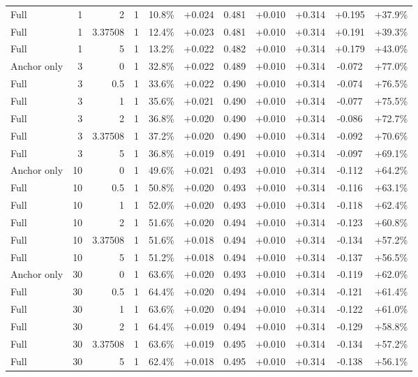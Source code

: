 \begin{table}[htbp]
\begin{tabular}{lrrrccccccc}
Full & 1 & 2 & 1 & 10.8\% & +0.024 & 0.481 & +0.010 & +0.314 & +0.195 & +37.9\% \\
Full & 1 & 3.37508 & 1 & 12.4\% & +0.023 & 0.481 & +0.010 & +0.314 & +0.191 & +39.3\% \\
Full & 1 & 5 & 1 & 13.2\% & +0.022 & 0.482 & +0.010 & +0.314 & +0.179 & +43.0\% \\
Anchor only & 3 & 0 & 1 & 32.8\% & +0.022 & 0.489 & +0.010 & +0.314 & -0.072 & +77.0\% \\
Full & 3 & 0.5 & 1 & 33.6\% & +0.022 & 0.490 & +0.010 & +0.314 & -0.074 & +76.5\% \\
Full & 3 & 1 & 1 & 35.6\% & +0.021 & 0.490 & +0.010 & +0.314 & -0.077 & +75.5\% \\
Full & 3 & 2 & 1 & 36.8\% & +0.020 & 0.490 & +0.010 & +0.314 & -0.086 & +72.7\% \\
Full & 3 & 3.37508 & 1 & 37.2\% & +0.020 & 0.490 & +0.010 & +0.314 & -0.092 & +70.6\% \\
Full & 3 & 5 & 1 & 36.8\% & +0.019 & 0.491 & +0.010 & +0.314 & -0.097 & +69.1\% \\
Anchor only & 10 & 0 & 1 & 49.6\% & +0.021 & 0.493 & +0.010 & +0.314 & -0.112 & +64.2\% \\
Full & 10 & 0.5 & 1 & 50.8\% & +0.020 & 0.493 & +0.010 & +0.314 & -0.116 & +63.1\% \\
Full & 10 & 1 & 1 & 52.0\% & +0.020 & 0.493 & +0.010 & +0.314 & -0.118 & +62.4\% \\
Full & 10 & 2 & 1 & 51.6\% & +0.020 & 0.494 & +0.010 & +0.314 & -0.123 & +60.8\% \\
Full & 10 & 3.37508 & 1 & 51.6\% & +0.018 & 0.494 & +0.010 & +0.314 & -0.134 & +57.2\% \\
Full & 10 & 5 & 1 & 51.2\% & +0.018 & 0.494 & +0.010 & +0.314 & -0.137 & +56.5\% \\
Anchor only & 30 & 0 & 1 & 63.6\% & +0.020 & 0.493 & +0.010 & +0.314 & -0.119 & +62.0\% \\
Full & 30 & 0.5 & 1 & 64.4\% & +0.020 & 0.494 & +0.010 & +0.314 & -0.121 & +61.4\% \\
Full & 30 & 1 & 1 & 63.6\% & +0.020 & 0.494 & +0.010 & +0.314 & -0.122 & +61.0\% \\
Full & 30 & 2 & 1 & 64.4\% & +0.019 & 0.494 & +0.010 & +0.314 & -0.129 & +58.8\% \\
Full & 30 & 3.37508 & 1 & 63.6\% & +0.019 & 0.495 & +0.010 & +0.314 & -0.134 & +57.2\% \\
Full & 30 & 5 & 1 & 62.4\% & +0.018 & 0.495 & +0.010 & +0.314 & -0.138 & +56.1\% \\

\end{tabular}
\end{table}
